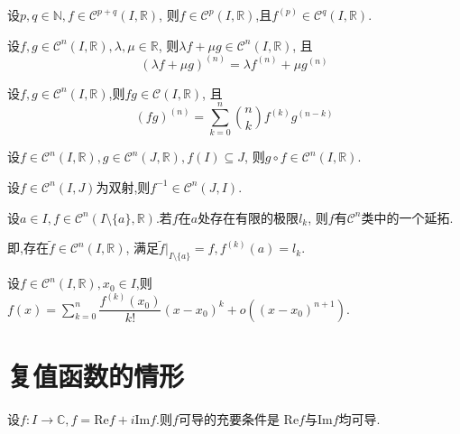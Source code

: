\begin{prop}
    设$p,q\in\mathbb{N},f\in\mathcal{C}^{p+q}(I,\mathbb{R})$,
    则$f\in\mathcal{C}^p(I,\mathbb{R})$,且$f^{(p)}\in\mathcal{C}^q(I,\mathbb{R})$.
\end{prop}

\begin{thm}
    设$f,g\in\mathcal{C}^n(I,\mathbb{R}),\lambda,\mu\in\mathbb{R}$,
    则$\lambda f+\mu g\in\mathcal{C}^n(I,\mathbb{R})$,
    且\[ (\lambda f+\mu g)^{(n)}=\lambda f^{(n)}+\mu g^{(n)} \]
\end{thm}

\begin{thm}[Leibniz]
    设$f,g\in\mathcal{C}^n(I,\mathbb{R})$,则$fg\in\mathcal{C}(I,\mathbb{R})$,
    且\[ (fg)^{(n)}=\sum\limits_{k=0}^n\binom{n}{k}f^{(k)}g^{(n-k)} \]
\end{thm}

\begin{thm}
    设$f\in\mathcal{C}^n(I,\mathbb{R}),g\in\mathcal{C}^n(J,\mathbb{R}),f(I)\subseteq J$,
    则$g \circ f\in\mathcal{C}^n(I,\mathbb{R})$.
\end{thm}

\begin{thm}
    设$f\in\mathcal{C}^n(I,J)$为双射,则$f^{-1}\in\mathcal{C}^n(J,I)$.
\end{thm}

\begin{thm}
    设$a\in I,f\in\mathcal{C}^n(I\setminus\{a\},\mathbb{R})$.若$f$在$a$处存在有限的极限$l_k$,
    则$f$有$\mathcal{C}^n$类中的一个延拓.

    即,存在$\tilde{f}\in\mathcal{C}^n(I,\mathbb{R})$,
    满足$\tilde{f}\vert_{I\setminus\{a\}}=f,f^{(k)}(a)=l_k$.
\end{thm}

\begin{thm}[高阶Lagrange中值定理]
    设$f\in\mathcal{C}^n(I,\mathbb{R}),x_0\in I$,则
    $f(x)=\sum\limits_{k=0}^n\dfrac{f^{(k)}(x_0)}{k!}(x-x_0)^k+o\left((x-x_0)^{n+1}\right)$.
\end{thm}

\section{复值函数的情形}

\begin{thm}
    设$f:I\to\mathbb{C},f=\mathrm{Re}f+i\mathrm{Im}f$.则$f$可导的充要条件是
    $\mathrm{Re}f$与$\mathrm{Im}f$均可导.
\end{thm}


